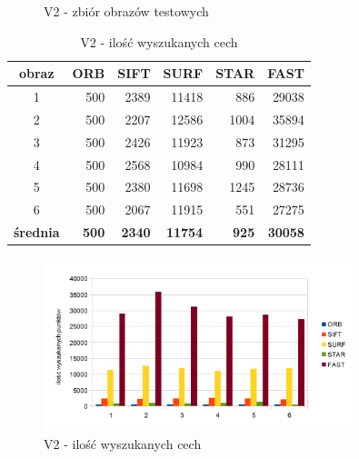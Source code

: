 \begin{figure}[!htb]
\begin{center}
{}
\caption{V2 - zbiór obrazów testowych}
\label{fig:v2_set}
\end{center}
\end{figure}



\begin{table}[htbp]
  \centering
  \caption{V2 - ilość wyszukanych cech}
    \begin{tabular}{|c|r|r|r|r|r|}\hline
    
    obraz & \textbf{ORB} & \textbf{SIFT} & \textbf{SURF} & \textbf{STAR} & \textbf{FAST} \\\hline
    
   
    1 & 500 & 2389 & 11418 & 886 & 29038 \\
    2 & 500 & 2207 & 12586 & 1004 & 35894 \\
    3 & 500 & 2426 & 11923 & 873 & 31295 \\
    4 & 500 & 2568 & 10984 & 990 & 28111 \\
    5 & 500 & 2380 & 11698 & 1245 & 28736 \\
    6 & 500 & 2067 & 11915 & 551 & 27275 \\\hline
    \textbf{średnia} & \textbf{500} & \textbf{2340} & \textbf{11754} & \textbf{925} & \textbf{30058} \\
    \hline
    \end{tabular}%
  \label{tab:v2_f1}%
\end{table}%


\begin{figure}
\centering
\includegraphics[width=0.8\textwidth]{pict/slowik/v2/F1.png}
\caption{V2 - ilość wyszukanych cech}
\label{fig:v2_f1}
\end{figure}


